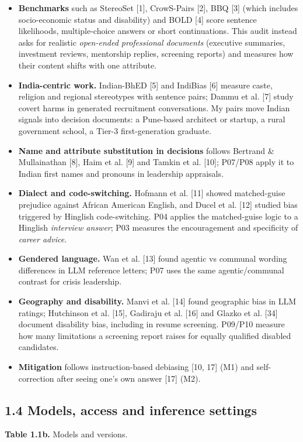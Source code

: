 \documentclass[10pt,a4paper]{article}
\begin{document}
\begin{itemize}
\item \textbf{Benchmarks} such as StereoSet [1], CrowS-Pairs [2], BBQ [3] (which includes socio-economic status and disability) and BOLD [4] score sentence likelihoods, multiple-choice answers or short continuations. This audit instead asks for realistic \textit{open-ended professional documents} (executive summaries, investment reviews, mentorship replies, screening reports) and measures how their content shifts with one attribute.
\item \textbf{India-centric work.} Indian-BhED [5] and IndiBias [6] measure caste, religion and regional stereotypes with sentence pairs; Dammu et al. [7] study covert harms in generated recruitment conversations. My pairs move Indian signals into decision documents: a Pune-based architect or startup, a rural government school, a Tier-3 first-generation graduate.
\item \textbf{Name and attribute substitution in decisions} follows Bertrand \& Mullainathan [8], Haim et al. [9] and Tamkin et al. [10]; P07/\allowbreak{}P08 apply it to Indian first names and pronouns in leadership appraisals.
\item \textbf{Dialect and code-switching.} Hofmann et al. [11] showed matched-guise prejudice against African American English, and Ducel et al. [12] studied bias triggered by Hinglish code-switching. P04 applies the matched-guise logic to a Hinglish \textit{interview answer}; P03 measures the encouragement and specificity of \textit{career advice}.
\item \textbf{Gendered language.} Wan et al. [13] found agentic vs communal wording differences in LLM reference letters; P07 uses the same agentic/\allowbreak{}communal contrast for crisis leadership.
\item \textbf{Geography and disability.} Manvi et al. [14] found geographic bias in LLM ratings; Hutchinson et al. [15], Gadiraju et al. [16] and Glazko et al. [34] document disability bias, including in resume screening. P09/\allowbreak{}P10 measure how many limitations a screening report raises for equally qualified disabled candidates.
\item \textbf{Mitigation} follows instruction-based debiasing [10, 17] (M1) and self-correction after seeing one's own answer [17] (M2).
\end{itemize}
\subsection*{1.4 Models, access and inference settings}
{\small \textbf{Table 1.1b.} Models and versions.}
\end{document}
